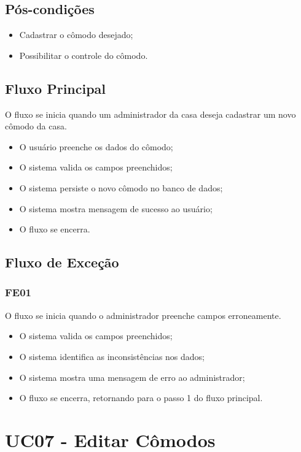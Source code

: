     \subsection{Pós-condições}
        \begin{itemize}
            \item Cadastrar o cômodo desejado;
            \item Possibilitar o controle do cômodo.
        \end{itemize}
    \subsection{Fluxo Principal}
        O fluxo se inicia quando um administrador da casa deseja cadastrar um novo cômodo da casa.
        \begin{itemize}
            \item O usuário preenche os dados do cômodo;
            \item O sistema valida os campos preenchidos;
            \item O sistema persiste o novo cômodo no banco de dados;
            \item O sistema mostra mensagem de sucesso ao usuário;
            \item O fluxo se encerra.
        \end{itemize}
    \subsection{Fluxo de Exceção}
        \subsubsection{FE01}
            O fluxo se inicia quando o administrador preenche campos erroneamente.
            \begin{itemize}
                \item O sistema valida os campos preenchidos;
                \item O sistema identifica as inconsistências nos dados;
                \item O sistema mostra uma mensagem de erro ao administrador;
                \item O fluxo se encerra, retornando para o passo 1 do fluxo principal.
            \end{itemize}

\section{UC07 \-- Editar Cômodos}
